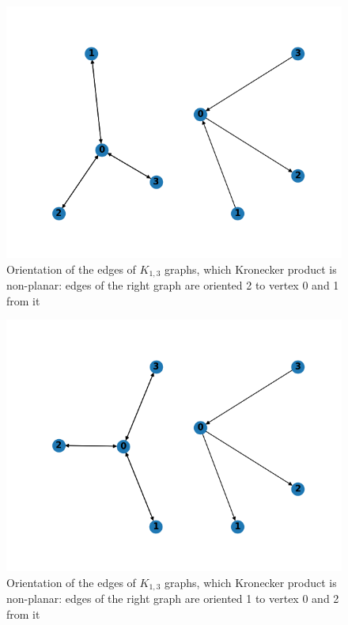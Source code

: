 \begin{figure}[h]

  \begin{center}  
  \includegraphics[scale = 0.3]{k13_12.png}
  \end{center}

  \caption{Orientation of the edges of $K_{1, 3}$ graphs, which Kronecker product is non-planar: edges of the right graph are oriented 2 to vertex $0$ and 1 from it}

  \label{fig:k13_12}

\end{figure}

\begin{figure}[h]

  \begin{center}  
  \includegraphics[scale = 0.3]{k13_21.png}
  \end{center}

  \caption{Orientation of the edges of $K_{1, 3}$ graphs, which Kronecker product is non-planar: edges of the right graph are oriented 1 to vertex $0$ and 2 from it}

  \label{fig:k13_21}

\end{figure}

